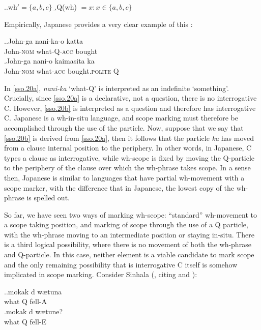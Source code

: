 \documentclass[11pt]{article}
\begin{document}
\ex.\label{sso.10}\a.wh$' = \{a,b,c\}$
   \b.Q(wh) $= x: x \in \{a,b,c\}$

Empirically, Japanese provides a very clear example of this  \citep{hagstrom:1998}:

\ex.\ag.\label{sso.20a}John-ga nani-ka-o katta\\
  John-\textsc{nom} what-Q-\textsc{acc} bought\\
  \bg.\label{sso.20b}John-ga nani-o kaimasita ka\\
  John-\textsc{nom} what-\textsc{acc} bought.\textsc{polite} Q\\

In \ref{sso.20a}, \textit{nani-ka} `what-Q' is interpreted as an indefinite `something'. Crucially, since \ref{sso.20a} is a declarative, not a question, there is no interrogative C. However, \ref{sso.20b} is interpreted as a question and therefore has interrogative C. Japanese is a wh-in-situ language, and scope marking must therefore be accomplished through the use of the particle. Now, suppose that we say that \ref{sso.20b} is derived from \ref{sso.20a}, then it follows that the particle \textit{ka} has moved from a clause internal position to the periphery. In other words, in Japanese, C types a clause as interrogative, while wh-scope is fixed by moving the Q-particle to the periphery of the clause over which the wh-phrase takes scope. In a sense then, Japanese is similar to languages that have partial wh-movement with a scope marker, with the difference that in Japanese, the lowest copy of the wh-phrase is spelled out.

So far, we have seen two ways of marking wh-scope: ``standard'' wh-movement to a scope taking position, and marking of scope through the use of a Q particle, with the wh-phrase moving to an intermediate position or staying in-situ. There is a third logical possibility, where there is no movement of both the wh-phrase and Q-particle. In this case, neither element is a viable candidate to mark scope and the only remaining possibility that is interrogative C itself is somehow implicated in scope marking. Consider Sinhala (\cite{slade:2011}, citing \cite{gair-sumangala:1991} and \cite{hagstrom:1998}):

\ex.\ag.\label{sso.30a}mokak d{\textschwa} w{\ae}tuna\\
   what Q fell-A\\
   \bg.\label{sso.30b}mokak d{\textschwa} w{\ae}tune?\\
   what Q fell-E\\
\end{document}
